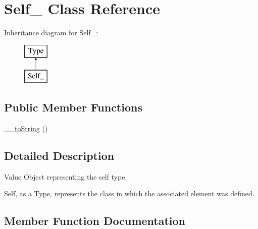 \hypertarget{classphp_documentor_1_1_reflection_1_1_types_1_1_self__}{}\section{Self\+\_\+ Class Reference}
\label{classphp_documentor_1_1_reflection_1_1_types_1_1_self__}
Inheritance diagram for Self\+\_\+\+:\begin{figure}[H]
\begin{center}
\leavevmode
\includegraphics[height=2.000000cm]{classphp_documentor_1_1_reflection_1_1_types_1_1_self__}
\end{center}
\end{figure}
\subsection*{Public Member Functions}
\begin{DoxyCompactItemize}
\item 
\mbox{\hyperlink{classphp_documentor_1_1_reflection_1_1_types_1_1_self___a7516ca30af0db3cdbf9a7739b48ce91d}{\+\_\+\+\_\+to\+String}} ()
\end{DoxyCompactItemize}


\subsection{Detailed Description}
Value Object representing the \textquotesingle{}self\textquotesingle{} type.

Self, as a \mbox{\hyperlink{interfacephp_documentor_1_1_reflection_1_1_type}{Type}}, represents the class in which the associated element was defined. 

\subsection{Member Function Documentation}
\mbox{\label{classphp_documentor_1_1_reflection_1_1_types_1_1_self___a7516ca30af0db3cdbf9a7739b48ce91d}} 
